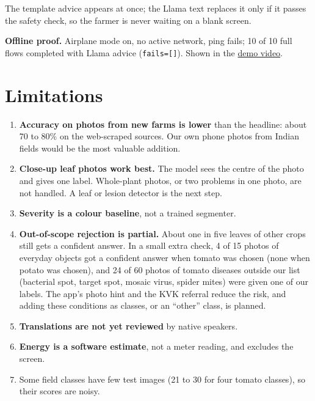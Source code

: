 \documentclass[11pt,a4paper]{article}
\begin{document}
The template advice appears at once; the Llama text replaces it only if it passes
the safety check, so the farmer is never waiting on a blank screen.

\textbf{Offline proof.} Airplane mode on, no active network, ping fails; 10 of 10
full flows completed with Llama advice (\texttt{fails=[]}). Shown in the
\href{https://drive.google.com/file/d/1YLU4_h4lRAjxv5cIshW1-GhEhf6i896o/view?usp=drive_link}{demo video}.

\section{Limitations}

\begin{enumerate}
  \item \textbf{Accuracy on photos from new farms is lower} than the headline:
        about 70 to 80\% on the web-scraped sources. Our own phone photos from
        Indian fields would be the most valuable addition.
  \item \textbf{Close-up leaf photos work best.} The model sees the centre of the
        photo and gives one label. Whole-plant photos, or two problems in one
        photo, are not handled. A leaf or lesion detector is the next step.
  \item \textbf{Severity is a colour baseline}, not a trained segmenter.
  \item \textbf{Out-of-scope rejection is partial.} About one in five leaves of
        other crops still gets a confident answer. In a small extra check, 4 of 15
        photos of everyday objects got a confident answer when tomato was chosen
        (none when potato was chosen), and 24 of 60 photos of tomato diseases
        outside our list (bacterial spot, target spot, mosaic virus, spider mites)
        were given one of our labels. The app's photo hint and the KVK referral
        reduce the risk, and adding these conditions as classes, or an ``other''
        class, is planned.
  \item \textbf{Translations are not yet reviewed} by native speakers.
  \item \textbf{Energy is a software estimate}, not a meter reading, and excludes
        the screen.
  \item Some field classes have few test images (21 to 30 for four tomato
        classes), so their scores are noisy.
\end{enumerate}
\end{document}
